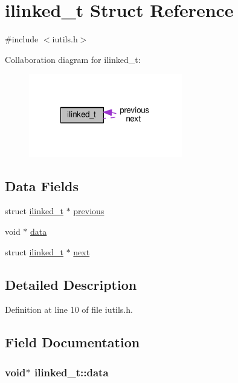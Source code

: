 \hypertarget{structilinked__t}{\section{ilinked\-\_\-t Struct Reference}
\label{structilinked__t}
}


{\ttfamily \#include $<$iutils.\-h$>$}



Collaboration diagram for ilinked\-\_\-t\-:\nopagebreak
\begin{figure}[H]
\begin{center}
\leavevmode
\includegraphics[width=190pt]{structilinked__t__coll__graph}
\end{center}
\end{figure}
\subsection*{Data Fields}
\begin{DoxyCompactItemize}
\item 
struct \hyperlink{structilinked__t}{ilinked\-\_\-t} $\ast$ \hyperlink{structilinked__t_a6bace3c90bc1b272be7506fe4d259a71}{previous}
\item 
void $\ast$ \hyperlink{structilinked__t_ac285ea385953cbd5a332b2cbab39b62b}{data}
\item 
struct \hyperlink{structilinked__t}{ilinked\-\_\-t} $\ast$ \hyperlink{structilinked__t_ad3f173c464d58934b12da4eca2ff83f8}{next}
\end{DoxyCompactItemize}


\subsection{Detailed Description}


Definition at line 10 of file iutils.\-h.



\subsection{Field Documentation}
\hypertarget{structilinked__t_ac285ea385953cbd5a332b2cbab39b62b}{
\subsubsection[{data}]{\setlength{\rightskip}{0pt plus 5cm}void$\ast$ ilinked\-\_\-t\-::data}}\label{structilinked__t_ac285ea385953cbd5a332b2cbab39b62b}



